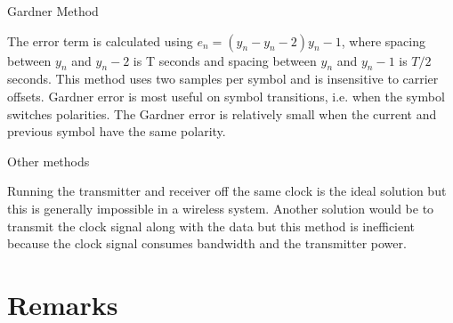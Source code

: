 \documentclass{article}
\begin{document}
Gardner Method

The error term is calculated using $e_n=(y_n-y_n-2)y_n-1$, where spacing between $y_n$ and 
$y_n-2$ is T seconds and spacing between $y_n$ and $y_n-1$ is $T/2$ seconds.
This method uses two samples per symbol and is insensitive to carrier offsets.
Gardner error is most useful on symbol transitions, i.e. when the symbol switches polarities. 
The Gardner error is relatively small when the current and previous symbol have the same 
polarity.


Other methods

Running the transmitter and receiver off the same clock is the ideal solution but this is 
generally impossible in a wireless system. Another solution would be to transmit the clock 
signal along with the data but this method is inefficient because the clock signal consumes 
bandwidth and the transmitter power.


\section{Remarks}
\label{sec:remarks}
\end{document}
